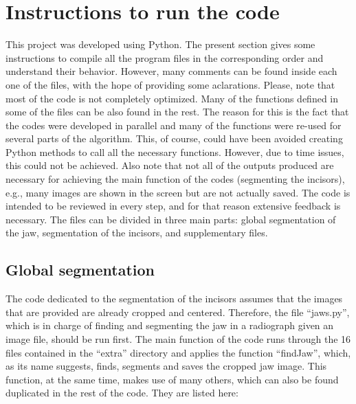\documentclass[a4paper,11pt,twoside]{article}
\begin{document}
\section{Instructions to run the code}\label{python}

This project was developed using Python. The present section gives some instructions to compile all the program files in the corresponding order and understand their behavior. However, many comments can be found inside each one of the files, with the hope of providing some aclarations. Please, note that most of the code is not completely optimized. Many of the functions defined in some of the files can be also found in the rest. The reason for this is the fact that the codes were developed in parallel and many of the functions were re-used for several parts of the algorithm. This, of course, could have been avoided creating Python methods to call all the necessary functions. However, due to time issues, this could not be achieved. Also note that not all of the outputs produced are necessary for achieving the main function of the codes (segmenting the incisors), e.g., many images are shown in the screen but are not actually saved. The code is intended to be reviewed in every step, and for that reason extensive feedback is necessary. The files can be divided in three main parts: global segmentation of the jaw, segmentation of the incisors, and supplementary files. 

\subsection{Global segmentation}

The code dedicated to the segmentation of the incisors assumes that the images that are provided are already cropped and centered. Therefore, the file ``jaws.py'', which is in charge of finding and segmenting the jaw in a radiograph given an image file, should be run first. The main function of the code runs through the 16 files contained in the ``extra'' directory and applies the function ``findJaw'', which, as its name suggests, finds, segments and saves the cropped jaw image. This function, at the same time, makes use of many others,  which can also be found duplicated in the rest of the code. They are listed here:
\end{document}
